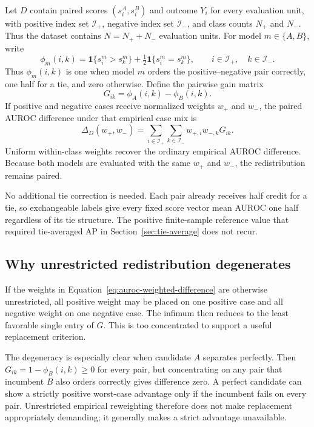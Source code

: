 \documentclass[11pt]{article}
\theoremstyle{remark}
\begin{document}
Let $D$ contain paired scores $(s_i^A,s_i^B)$ and outcome $Y_i$ for every
evaluation unit, with positive index set $\mathcal I_+$, negative index set
$\mathcal I_-$, and class counts $N_+$ and $N_-$. Thus the dataset contains
$N=N_++N_-$ evaluation units. For model $m\in\{A,B\}$,
write
\[
\phi_m(i,k)
=
\mathbf 1\{s_i^m>s_k^m\}
+\tfrac12\mathbf 1\{s_i^m=s_k^m\},
\qquad i\in\mathcal I_+,\quad k\in\mathcal I_-.
\]
Thus $\phi_m(i,k)$ is one when model $m$ orders the positive--negative
pair correctly, one half for a tie, and zero otherwise. Define the pairwise
gain matrix
\[
G_{ik}=\phi_A(i,k)-\phi_B(i,k).
\]
If positive and negative cases receive normalized weights $w_+$ and $w_-$,
the paired AUROC difference under that empirical case mix is
\begin{equation}
\Delta_D(w_+,w_-)
=
\sum_{i\in\mathcal I_+}\sum_{k\in\mathcal I_-}
w_{+,i}w_{-,k}G_{ik}.
\label{eq:auroc-weighted-difference}
\end{equation}
Uniform within-class weights recover the ordinary empirical AUROC difference.
Because both models are evaluated with the same $w_+$ and $w_-$, the
redistribution remains paired.

No additional tie correction is needed. Each pair already receives half credit
for a tie, so exchangeable labels give every fixed score vector mean AUROC one
half regardless of its tie structure. The positive finite-sample reference
value that required tie-averaged AP in Section~\ref{sec:tie-average} does not
recur.

\subsection{Why unrestricted redistribution degenerates}

If the weights in Equation~\eqref{eq:auroc-weighted-difference} are otherwise
unrestricted, all positive weight may be placed on one positive case and all
negative weight on one negative case. The infimum then reduces to the least
favorable single entry of $G$. This is too concentrated to support a useful
replacement criterion.

The degeneracy is especially clear when candidate $A$ separates perfectly.
Then $G_{ik}=1-\phi_B(i,k)\geq0$ for every pair, but concentrating on any pair
that incumbent $B$ also orders correctly gives difference zero. A perfect
candidate can show a strictly positive worst-case advantage only if the
incumbent fails on every pair. Unrestricted empirical reweighting therefore
does not make replacement appropriately demanding; it generally makes a
strict advantage unavailable.
\end{document}
